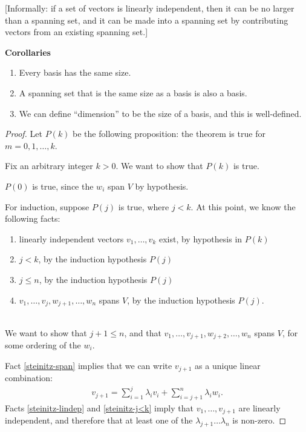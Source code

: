\documentclass[12pt]{article}
\begin{document}
[Informally: if a set of vectors is linearly independent, then it can be no
larger than a spanning set, and it can be made into a spanning set by
contributing vectors from an existing spanning set.]

\textbf{Corollaries}
\begin{enumerate}
\item Every basis has the same size.
\item A spanning set that is the same size as a basis is also a basis.
\item We can define ``dimension'' to be the size of a basis, and this is
  well-defined.
\end{enumerate}

\begin{proof}
  Let $P(k)$ be the following proposition: the theorem is true for $m = 0, 1, \ldots, k$.

  Fix an arbitrary integer $k > 0$. We want to show that $P(k)$ is true.

  $P(0)$ is true, since the $w_i$ span $V$ by hypothesis.

  For induction, suppose $P(j)$ is true, where $j < k$. At this point, we know
  the following facts:~\\

  \begin{enumerate}[label=\roman*)]
  \item linearly independent vectors $v_1, \ldots, v_k$ exist, by hypothesis in
    $P(k)$ \label{steinitz-lindep}
  \item $j < k$, by the induction hypothesis $P(j)$ \label{steinitz-j<k}
  \item $j \leq n$, by the induction hypothesis $P(j)$ \label{steinitz-j-leq-n}
  \item $v_1, \ldots, v_j, w_{j+1}, \ldots, w_n$ spans $V$, by the induction
    hypothesis $P(j)$. \label{steinitz-span}
  \end{enumerate}
  ~\\
  We want to show that $j+1 \leq n$, and that
  $v_1, \ldots, v_{j+1}, w_{j+2}, \ldots, w_n$ spans $V$, for some ordering of
  the $w_i$.

  Fact \ref{steinitz-span} implies that we can write $v_{j+1}$ as a unique
  linear combination:
  \begin{align*}
    v_{j+1} = \sum_{i=1}^j \lambda_iv_i + \sum_{i=j+1}^n\lambda_iw_i.
  \end{align*}
  Facts \ref{steinitz-lindep} and \ref{steinitz-j<k} imply that
  $v_1, \ldots, v_{j+1}$ are linearly independent, and therefore that at least
  one of the $\lambda_{j+1} \ldots \lambda_n$ is non-zero.


\end{proof}
\end{document}
